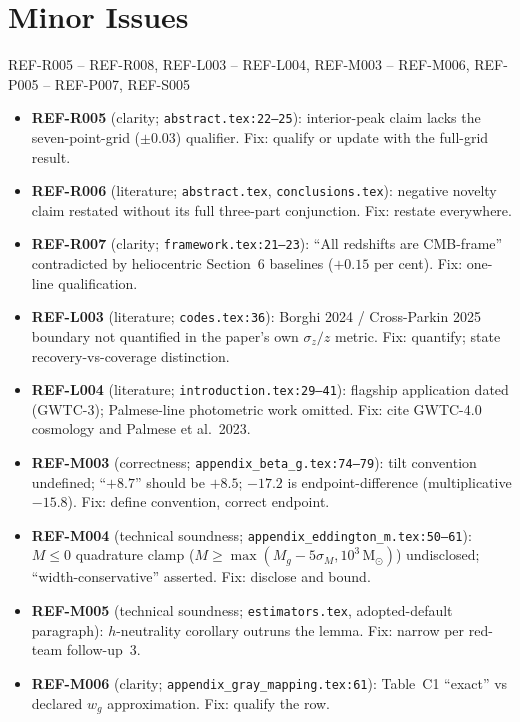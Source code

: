 \documentclass[11pt]{article}
\begin{document}
\section*{Minor Issues}

\begin{MinorIssueBox}{REF-R005 -- REF-R008, REF-L003 -- REF-L004, REF-M003 -- REF-M006, REF-P005 -- REF-P007, REF-S005}
\begin{itemize}
  \item \textbf{REF-R005} (clarity; \texttt{abstract.tex:22--25}): interior-peak claim lacks the seven-point-grid ($\pm 0.03$) qualifier. Fix: qualify or update with the full-grid result.
  \item \textbf{REF-R006} (literature; \texttt{abstract.tex}, \texttt{conclusions.tex}): negative novelty claim restated without its full three-part conjunction. Fix: restate everywhere.
  \item \textbf{REF-R007} (clarity; \texttt{framework.tex:21--23}): ``All redshifts are CMB-frame'' contradicted by heliocentric Section~6 baselines ($+0.15$ per cent). Fix: one-line qualification.
  \item \textbf{REF-L003} (literature; \texttt{codes.tex:36}): Borghi 2024 / Cross-Parkin 2025 boundary not quantified in the paper's own $\sigma_z/z$ metric. Fix: quantify; state recovery-vs-coverage distinction.
  \item \textbf{REF-L004} (literature; \texttt{introduction.tex:29--41}): flagship application dated (GWTC-3); Palmese-line photometric work omitted. Fix: cite GWTC-4.0 cosmology and Palmese et al.\ 2023.
  \item \textbf{REF-M003} (correctness; \texttt{appendix\_beta\_g.tex:74--79}): tilt convention undefined; ``$+8.7$'' should be $+8.5$; $-17.2$ is endpoint-difference (multiplicative $-15.8$). Fix: define convention, correct endpoint.
  \item \textbf{REF-M004} (technical soundness; \texttt{appendix\_eddington\_m.tex:50--61}): $M \le 0$ quadrature clamp ($M \ge \max(M_g - 5\sigma_M, 10^3\,\mathrm{M}_\odot)$) undisclosed; ``width-conservative'' asserted. Fix: disclose and bound.
  \item \textbf{REF-M005} (technical soundness; \texttt{estimators.tex}, adopted-default paragraph): $h$-neutrality corollary outruns the lemma. Fix: narrow per red-team follow-up~3.
  \item \textbf{REF-M006} (clarity; \texttt{appendix\_gray\_mapping.tex:61}): Table~C1 ``exact'' vs declared $w_g$ approximation. Fix: qualify the row.

\end{itemize}
\end{MinorIssueBox}
\end{document}
